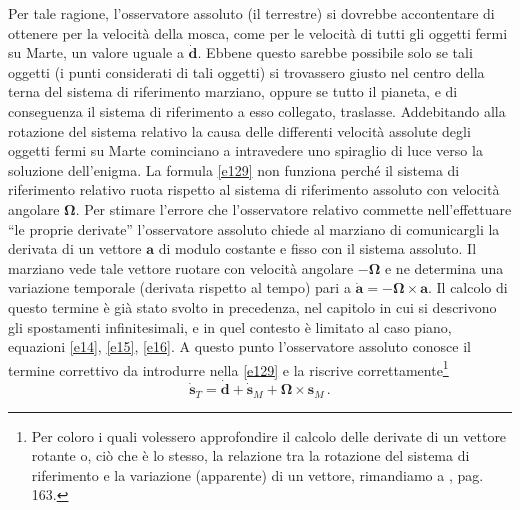 Per tale ragione, l'osservatore assoluto (il terrestre) si dovrebbe accontentare di ottenere
per la velocit\`a della mosca, come per le velocit\`a di tutti gli oggetti fermi
 su Marte, un valore uguale a
$\dot{\bm{d}}$. Ebbene questo sarebbe possibile solo se tali oggetti (i
punti considerati di tali oggetti) si trovassero giusto
nel centro della terna del sistema di riferimento marziano, oppure se tutto il pianeta,
e di conseguenza il sistema di riferimento a esso collegato, traslasse.
\noindent Addebitando alla rotazione del sistema relativo la causa delle differenti velocit\`a assolute
degli oggetti fermi su Marte cominciano a intravedere uno
spiraglio di luce verso la soluzione dell'enigma. La formula
\ref{e129} non funziona perch\'e il sistema di riferimento relativo ruota rispetto
al sistema di riferimento assoluto con velocit\`a angolare $\bm \Omega$. Per  stimare
 l'errore
che l'osservatore relativo commette nell'effettuare ``le proprie derivate'' l'osservatore
assoluto chiede al marziano di comunicargli
la derivata di un vettore $\bm a$
di modulo costante e fisso con il sistema assoluto.
Il marziano vede tale vettore
ruotare con velocit\`a angolare $-\bm \Omega$ e ne
determina una variazione temporale (derivata rispetto al tempo)
 pari a $\dot{\bm a}= - {\bm \Omega}\times {\bm a}$.
\noindent Il calcolo di questo termine \`e gi\`a stato svolto in precedenza, nel capitolo
in cui si descrivono gli spostamenti infinitesimali, e in
quel contesto \`e limitato al caso
piano, equazioni \ref{e14}, \ref{e15}, \ref{e16}.
A questo punto l'osservatore assoluto conosce il termine correttivo da introdurre 
nella \ref{e129} e la riscrive correttamente\footnote
{
Per coloro i quali volessero approfondire il calcolo delle
derivate di un vettore rotante o, ci\`o che \`e lo stesso, la relazione
tra la rotazione del sistema di riferimento e la variazione (apparente)
di un vettore, rimandiamo a \cite{finzi}, pag. 163.
}
\begin{equation}
\dot{\bm{s}}_{\scriptscriptstyle{T}}=
	\dot{\bm{d}}+
\dot{\bm{s}}_{\scriptscriptstyle{M}}+
 {\bm \Omega}\times 
	\bm{s}_{\scriptscriptstyle{M}}\,.
\label{e130}
\end{equation}

